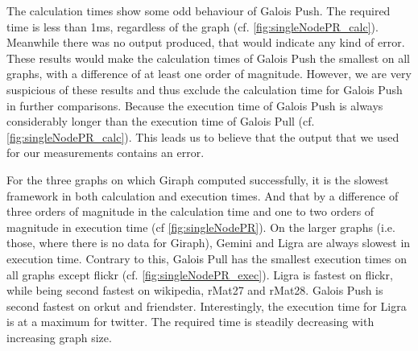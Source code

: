 The calculation times show some odd behaviour of Galois Push. The required time is less than 1ms, regardless of the graph (cf. \autoref{fig:singleNodePR_calc}). Meanwhile there was no output produced, that would indicate any kind of error. These results would make the calculation times of Galois Push the smallest on all graphs, with a difference of at least one order of magnitude. However, we are very suspicious of these results and thus exclude the calculation time for Galois Push in further comparisons. Because the execution time of Galois Push is always considerably longer than the execution time of Galois Pull (cf. \autoref{fig:singleNodePR_calc}). This leads us to believe that the output that we used for our measurements contains an error.

For the three graphs on which Giraph computed successfully, it is the slowest framework in both calculation and execution times. And that by a difference of three orders of magnitude in the calculation time and one to two orders of magnitude in execution time (cf \autoref{fig:singleNodePR}). On the larger graphs (i.e. those, where there is no data for Giraph), Gemini and Ligra are always slowest in execution time.
Contrary to this, Galois Pull has the smallest execution times on all graphs except flickr (cf. \autoref{fig:singleNodePR_exec}). Ligra is fastest on flickr, while being second fastest on wikipedia, rMat27 and rMat28. Galois Push is second fastest on orkut and friendster.
Interestingly, the execution time for Ligra is at a maximum for twitter. The required time is steadily decreasing with increasing graph size.



